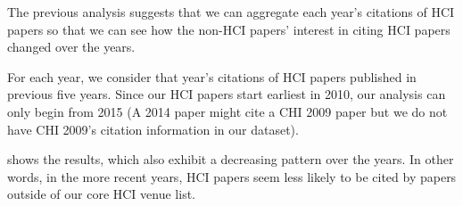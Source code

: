 The previous analysis suggests that we can aggregate each year's citations of HCI papers so that we can see how the non-HCI papers' interest in citing HCI papers changed over the years.

For each year, we consider that year's citations of HCI papers published in previous five years.
Since our HCI papers start earliest in 2010, our analysis can only begin from 2015 (A 2014 paper might cite a CHI 2009 paper but we do not have CHI 2009's citation information in our dataset).

 shows the results, which also exhibit a decreasing pattern over the years.
In other words, in the more recent years, HCI papers seem less likely to be cited by papers outside of our core HCI venue list.

